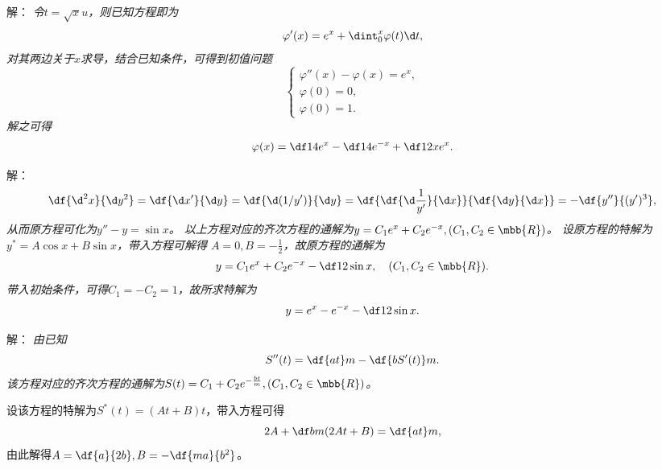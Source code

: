 \begin{frame}
	\linespread{1.5}
	
	\bigskip
	
	\small 解：\it
	令$t=\sqrt xu$，则已知方程即为
	$$\varphi'(x)=e^x+\dint_0^x\varphi(t)\d t,$$
	对其两边关于$x$求导，结合已知条件，可得到初值问题
	$$
		\left\{\begin{array}{l}
			\varphi''(x)-\varphi(x)=e^x,\\
			\varphi(0)=0,\\
			\varphi(0)=1.
		\end{array}\right.
	$$
	解之可得
	$$\varphi(x)=\df14e^x-\df14e^{-x}+\df12xe^x.$$
	\fin
\end{frame}

\begin{frame}
	\linespread{1.5}
	
	
\end{frame}

\begin{frame}
	\linespread{1.5}
	\small 解：\it
	$$\df{\d^2x}{\d y^2}=\df{\d x'}{\d y}
	=\df{\d(1/y')}{\d y}=
	\df{\df{\d\frac1{y'}}{\d x}}{\df{\d y}{\d x}}=-\df{y''}{(y')^3},$$
	从而原方程可化为$y''-y=\sin x$。
	以上方程对应的齐次方程的通解为$y=C_1e^x+C_2e^{-x},(C_1,C_2\in\mbb{R})$。
	设原方程的特解为$y^*=A\cos x+B\sin x$，带入方程可解得
	$A=0,B=-\frac12$，故原方程的通解为
	$$y=C_1e^x+C_2e^{-x}-\df12\sin x,\quad (C_1,C_2\in\mbb{R}).$$
	带入初始条件，可得$C_1=-C_2=1$，故所求特解为
	$$y=e^x-e^{-x}-\df12\sin x.$$
	\fin
\end{frame}

\begin{frame}
	\linespread{1.5}
	
	\small 解：\it
	由已知
	$$S''(t)=\df{at}m-\df{bS'(t)}m.$$
	该方程对应的齐次方程的通解为$S(t)=C_1+C_2e^{-\frac{bt}m},(C_1,C_2\in\mbb{R})$。
	
	设该方程的特解为$S^*(t)=(At+B)t$，带入方程可得
	$$2A+\df bm(2At+B)=\df{at}m,$$
	由此解得$A=\df{a}{2b},B=-\df{ma}{b^2}$。
\end{frame}


